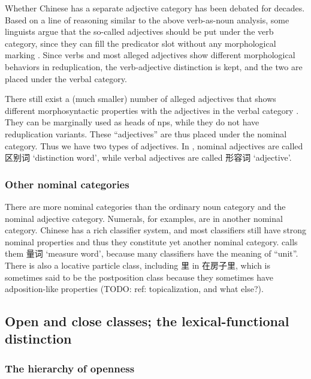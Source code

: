 \documentclass[UTF8, a4paper, oneside, scheme=plain]{ctexrep}
\newcommand*{\citechap}[1]{chap.~{#1}}
\newcommand{\translate}[1]{`#1'}
\begin{document}
Whether Chinese has a separate adjective category 
has been debated for decades.
Based on a line of reasoning similar to the above verb-as-noun analysis,
some linguists argue that the so-called adjectives should be put under the verb category,
since they can fill the predicator slot without any morphological marking \citep{li1989mandarin}.
Since verbs and most alleged adjectives show different morphological behaviors in reduplication, %
the verb-adjective distinction is kept,
and the two are placed under the verbal category.

There still exist a (much smaller) number of alleged adjectives that shows 
different morphosyntactic properties with the adjectives in the verbal category 
\citep[\citechap{5}]{paul2014new}.
They can be marginally used as heads of \ac{np}s,
while they do not have reduplication variants.
These ``adjectives'' are thus placed under the nominal category.
Thus we have two types of adjectives.
In \citet{zhudexigrammar}, 
nominal adjectives are called 区别词 \translate{distinction word},
while verbal adjectives are called 形容词 \translate{adjective}.

\subsubsection{Other nominal categories}

There are more nominal categories than the ordinary noun category and the nominal adjective category.
Numerals, for examples, are in another nominal category.
Chinese has a rich classifier system,
and most classifiers still have strong nominal properties
and thus they constitute yet another nominal category.
\citet{zhudexigrammar} calls them 量词 \translate{measure word},
because many classifiers have the meaning of ``unit''.
There is also a locative particle class, including 里 in 在房子里,
which is sometimes said to be the postposition class
because they sometimes have adposition-like properties (TODO: ref: topicalization, and what else?).

\subsection{Open and close classes; the lexical-functional distinction}

\subsubsection{The hierarchy of openness}
\end{document}
